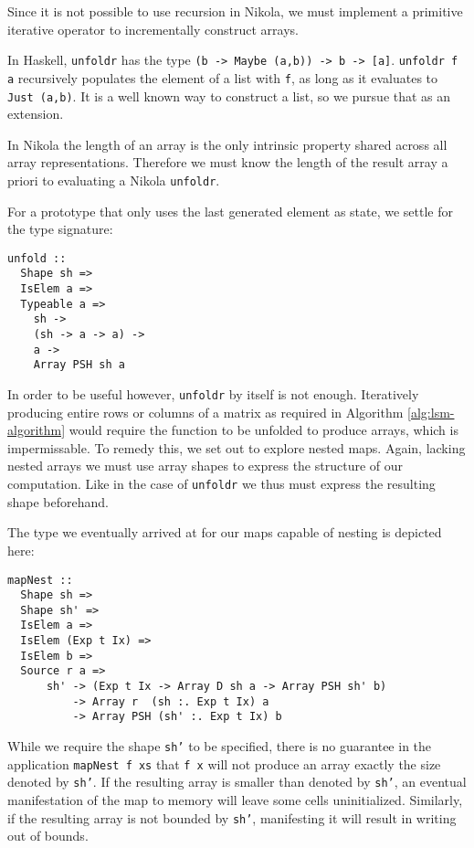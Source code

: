 Since it is not possible to use recursion in Nikola, we must implement a
primitive iterative operator to incrementally construct arrays.

In Haskell, \texttt{unfoldr} has the type \texttt{(b -> Maybe (a,b))
  -> b -> [a]}.  \texttt{unfoldr f a} recursively populates the
element of a list with \texttt{f}, as long as it evaluates to
\texttt{Just (a,b)}. It is a
well known way to construct a list, so we pursue that as an extension.

In Nikola the length of an array is the only intrinsic property shared across
all array representations. Therefore we must know the length of the result array a
priori to evaluating a Nikola \texttt{unfoldr}.

For a prototype that only uses the last generated element as state, we settle
for the type signature:
\begin{verbatim}
unfold ::
  Shape sh =>
  IsElem a =>
  Typeable a =>
    sh ->
    (sh -> a -> a) ->
    a ->
    Array PSH sh a
\end{verbatim}

In order to be useful however, \texttt{unfoldr} by itself is not enough.
Iteratively producing entire rows or columns of a matrix as required in
Algorithm \ref{alg:lsm-algorithm} would require the function to be unfolded to produce
arrays, which is impermissable.
To remedy this, we set out to explore nested maps. Again, lacking nested arrays
we must use array shapes to express the structure of our computation.  Like in
the case of \texttt{unfoldr} we thus must express the resulting shape beforehand.

The type we eventually arrived at for our maps capable of nesting is depicted
here:
\begin{verbatim}
mapNest ::
  Shape sh =>
  Shape sh' =>
  IsElem a =>
  IsElem (Exp t Ix) =>
  IsElem b =>
  Source r a =>
      sh' -> (Exp t Ix -> Array D sh a -> Array PSH sh' b)
          -> Array r  (sh :. Exp t Ix) a
          -> Array PSH (sh' :. Exp t Ix) b
\end{verbatim}

While we require the shape \texttt{sh'} to be specified, there is no guarantee
in the application \texttt{mapNest f xs} that \texttt{f x} will not produce an
array exactly the size denoted by \texttt{sh'}. If the resulting array is
smaller than denoted by \texttt{sh'}, an eventual manifestation of the map to
memory will leave some cells uninitialized. Similarly, if the resulting array
is not bounded by \texttt{sh'}, manifesting it will result in writing out of
bounds.


